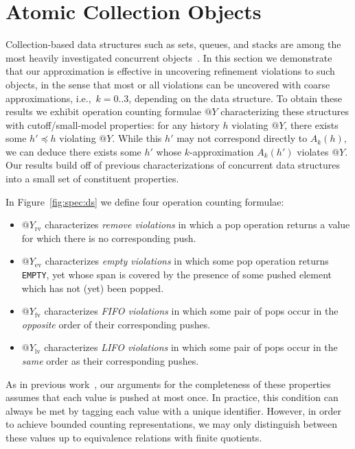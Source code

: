 \section{Atomic Collection Objects}
\label{sec:containers}

Collection-based data structures such as sets, queues, and stacks are among the
most heavily investigated concurrent objects~\cite{chapter/cds/MoirS07}. In
this section we demonstrate that our approximation is effective in uncovering
refinement violations to such objects, in the sense that most or all violations
can be uncovered with coarse approximations, i.e.,~$k=0..3$, depending on the
data structure. To obtain these results we exhibit operation counting formulae
$@Y$ characterizing these structures with cutoff/small-model properties: for
any history $h$ violating $@Y$, there exists some $h' \preceq h$ violating
$@Y$. While this $h'$ may not correspond directly to $A_k(h)$, we can deduce
there exists some $h'$ whose $k$-approximation $A_k(h')$ violates $@Y$. Our
results build off of previous characterizations of concurrent data
structures~\cite{conf/tacas/AbdullaHHJR13, conf/concur/HenzingerSV13} into a
small set of constituent properties.

In Figure~\ref{fig:spec:ds} we define four operation counting formulae:
\begin{itemize}

  \item $@Y_\mathrm{rv}$ characterizes \emph{remove violations} in which a
  {\sf pop} operation returns a value for which there is no corresponding {\sf
  push}.

  \item $@Y_\mathrm{ev}$ characterizes \emph{empty violations} in which some
  {\sf pop} operation returns {\tt EMPTY}, yet whose span is covered by the
  presence of some {\sf push}ed element which has not (yet) been {\sf pop}ped.

  \item $@Y_\mathrm{fv}$ characterizes \emph{FIFO violations} in which some
  pair of {\sf pop}s occur in the \emph{opposite} order of their corresponding
  {\sf push}es.

  \item $@Y_\mathrm{lv}$ characterizes \emph{LIFO violations} in which some
  pair of {\sf pop}s occur in the \emph{same} order as their corresponding {\sf
  push}es.

\end{itemize}
As in previous work~\cite{conf/tacas/AbdullaHHJR13, conf/concur/HenzingerSV13},
our arguments for the completeness of these properties assumes that each value
is {\sf push}ed at most once. In practice, this condition can always be met by
tagging each value with a unique identifier. However, in order to achieve
bounded counting representations, we may only distinguish between these values
up to equivalence relations with finite quotients.

